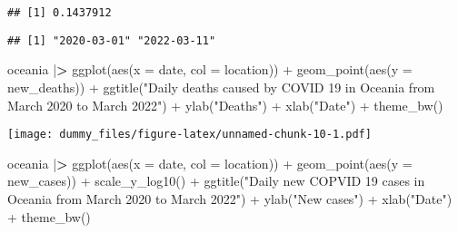 \documentclass[
]{article}
\newenvironment{Shaded}{\begin{snugshade}}{\end{snugshade}}
\newcommand{\AttributeTok}[1]{\textcolor[rgb]{0.77,0.63,0.00}{#1}}
\newcommand{\ErrorTok}[1]{\textcolor[rgb]{0.64,0.00,0.00}{\textbf{#1}}}
\newcommand{\FunctionTok}[1]{\textcolor[rgb]{0.00,0.00,0.00}{#1}}
\newcommand{\NormalTok}[1]{#1}
\newcommand{\SpecialCharTok}[1]{\textcolor[rgb]{0.00,0.00,0.00}{#1}}
\newcommand{\StringTok}[1]{\textcolor[rgb]{0.31,0.60,0.02}{#1}}
\begin{document}
\begin{verbatim}
## [1] 0.1437912
\end{verbatim}

\begin{Shaded}
\end{Shaded}

\begin{verbatim}
## [1] "2020-03-01" "2022-03-11"
\end{verbatim}

\begin{Shaded}
\begin{Highlighting}[]
\NormalTok{oceania }\SpecialCharTok{|}\ErrorTok{\textgreater{}} \FunctionTok{ggplot}\NormalTok{(}\FunctionTok{aes}\NormalTok{(}\AttributeTok{x =}\NormalTok{ date, }\AttributeTok{col =}\NormalTok{ location)) }\SpecialCharTok{+}
    \FunctionTok{geom\_point}\NormalTok{(}\FunctionTok{aes}\NormalTok{(}\AttributeTok{y =}\NormalTok{ new\_deaths)) }\SpecialCharTok{+}
    \FunctionTok{ggtitle}\NormalTok{(}\StringTok{"Daily deaths caused by COVID 19 in Oceania from March 2020 to March 2022"}\NormalTok{) }\SpecialCharTok{+}
    \FunctionTok{ylab}\NormalTok{(}\StringTok{"Deaths"}\NormalTok{) }\SpecialCharTok{+}
    \FunctionTok{xlab}\NormalTok{(}\StringTok{"Date"}\NormalTok{) }\SpecialCharTok{+} 
    \FunctionTok{theme\_bw}\NormalTok{()}
\end{Highlighting}
\end{Shaded}

\texttt{[image: dummy\_files/figure-latex/unnamed-chunk-10-1.pdf]}

\begin{Shaded}
\begin{Highlighting}[]
\NormalTok{oceania }\SpecialCharTok{|}\ErrorTok{\textgreater{}} \FunctionTok{ggplot}\NormalTok{(}\FunctionTok{aes}\NormalTok{(}\AttributeTok{x =}\NormalTok{ date, }\AttributeTok{col =}\NormalTok{ location)) }\SpecialCharTok{+}
    \FunctionTok{geom\_point}\NormalTok{(}\FunctionTok{aes}\NormalTok{(}\AttributeTok{y =}\NormalTok{ new\_cases)) }\SpecialCharTok{+}
    \FunctionTok{scale\_y\_log10}\NormalTok{() }\SpecialCharTok{+}
    \FunctionTok{ggtitle}\NormalTok{(}\StringTok{"Daily new COPVID 19 cases in Oceania from March 2020 to March 2022"}\NormalTok{) }\SpecialCharTok{+}
    \FunctionTok{ylab}\NormalTok{(}\StringTok{"New cases"}\NormalTok{) }\SpecialCharTok{+}
    \FunctionTok{xlab}\NormalTok{(}\StringTok{"Date"}\NormalTok{) }\SpecialCharTok{+}
    \FunctionTok{theme\_bw}\NormalTok{()}
\end{Highlighting}
\end{Shaded}
\end{document}
